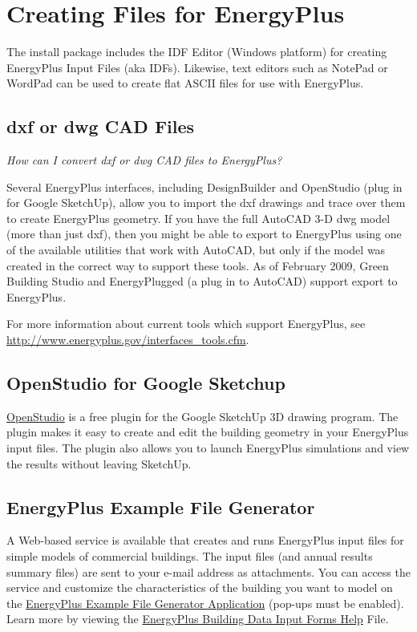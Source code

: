 \section{Creating Files for EnergyPlus}\label{creating-files-for-energyplus}

The install package includes the IDF Editor (Windows platform) for creating EnergyPlus Input Files (aka IDFs). Likewise, text editors such as NotePad or WordPad can be used to create flat ASCII files for use with EnergyPlus.

\subsection{dxf or dwg CAD Files}\label{dxf-or-dwg-cad-files}

\emph{How can I convert dxf or dwg CAD files to EnergyPlus?}

Several EnergyPlus interfaces, including DesignBuilder and OpenStudio (plug in for Google SketchUp), allow you to import the dxf drawings and trace over them to create EnergyPlus geometry. If you have the full AutoCAD 3-D dwg model (more than just dxf), then you might be able to export to EnergyPlus using one of the available utilities that work with AutoCAD, but only if the model was created in the correct way to support these tools. As of February 2009, Green Building Studio and EnergyPlugged (a plug in to AutoCAD) support export to EnergyPlus.

For more information about current tools which support EnergyPlus, see \url{http://www.energyplus.gov/interfaces_tools.cfm}.

\subsection{OpenStudio for Google Sketchup}\label{openstudio-for-google-sketchup}

\href{http://apps1.eere.energy.gov/buildings/energyplus/openstudio.cfm}{OpenStudio} is a free plugin for the Google SketchUp 3D drawing program. The plugin makes it easy to create and edit the building geometry in your EnergyPlus input files. The plugin also allows you to launch EnergyPlus simulations and view the results without leaving SketchUp.

\subsection{EnergyPlus Example File Generator}\label{energyplus-example-file-generator}

A Web-based service is available that creates and runs EnergyPlus input files for simple models of commercial buildings. The input files (and annual results summary files) are sent to your e-mail address as attachments. You can access the service and customize the characteristics of the building you want to model on the \href{http://apps1.eere.energy.gov/buildings/energyplus/cfm/inputs/}{EnergyPlus Example File Generator Application} (pop-ups must be enabled). Learn more by viewing the \href{http://apps1.eere.energy.gov/buildings/energyplus/cfm/inputs/help.cfm}{EnergyPlus Building Data Input Forms Help} File.
